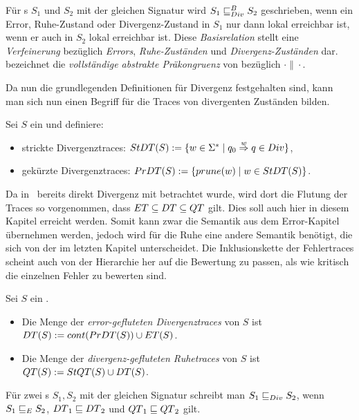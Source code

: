 \begin{Def}
Für \EIO{}s $S_1$ und $S_2$ mit der gleichen Signatur wird $S_1\sqsubseteq _{Div}^B S_2$
geschrieben, wenn ein Error, Ruhe-Zustand oder Divergenz-Zustand in $S_1$ nur
dann lokal erreichbar ist, wenn er auch in $S_2$ lokal erreichbar ist. Diese
\emph{Basisrelation} stellt eine \emph{Verfeinerung} bezüglich \emph{Errors},
\emph{Ruhe-Zuständen} und \emph{Divergenz-Zuständen} dar.\\
\DCRel{} bezeichnet die \emph{vollständige abstrakte Präkongruenz} von \DBRel{}
bezüglich $\cdot\|\cdot$.
\end{Def}

Da nun die grundlegenden Definitionen für Divergenz festgehalten sind,
kann man sich nun einen Begriff für die Traces von divergenten Zuständen
bilden.\\

\begin{Def}[Divergenztraces]
  Sei $S$ ein \EIO{} und definiere:
  \begin{itemize}
    \item strickte Divergenztraces: $StDT{}(S) := \{w\in\Sigma ^*\mid q_0
      \overset{w}{\Rightarrow} q\in Div\}$,
    \item gekürzte Divergenztraces: $PrDT{}(S) := \{prune (w)\mid
      w\in StDT{}(S)\}$.
  \end{itemize}
\end{Def}

Da in~\cite{Chilton2013} bereits direkt Divergenz mit betrachtet wurde, wird
dort die Flutung der Traces so vorgenommen, dass $ET\subseteq DT\subseteq
QT$ gilt. Dies soll auch hier in diesem Kapitel erreicht werden. Somit kann
zwar die Semantik aus dem Error-Kapitel übernehmen werden, jedoch wird für die
Ruhe eine andere Semantik benötigt, die sich von der im letzten Kapitel
unterscheidet. Die Inklusionskette der Fehlertraces scheint auch von der
Hierarchie her auf die Bewertung zu passen, als wie kritisch die einzelnen
Fehler zu bewerten sind.

\begin{Def}
\label{DefRuheDivSemantik}
  Sei $S$ ein \EIO{}.
  \begin{itemize}
    \item Die Menge der \emph{error-gefluteten Divergenztraces} von $S$ ist
      $DT{}(S) := cont{}(PrDT{}(S))\cup ET{}(S)$.
    \item Die Menge der \emph{divergenz-gefluteten Ruhetraces} von $S$ ist
      $QT{}(S) := StQT{}(S)\cup DT{}(S)$.
  \end{itemize}
  Für zwei \EIO{}s $S_1, S_2$ mit der gleichen Signatur schreibt man $S_1\sqsubseteq _{Div}
  S_2$, wenn $S_1\sqsubseteq _E S_2$, $DT{}_1\sqsubseteq DT{}_2$ und
  $QT{}_1\sqsubseteq QT{}_2$ gilt.
\end{Def}

